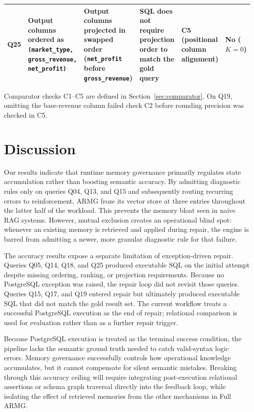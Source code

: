 \begin{table}[t]
\begin{tabularx}{\textwidth}{@{}c >{\raggedright\arraybackslash}p{3.3cm} >{\raggedright\arraybackslash}p{3.5cm} >{\raggedright\arraybackslash}p{2.8cm} >{\raggedright\arraybackslash}p{2.3cm} >{\raggedright\arraybackslash}X@{}}
Q25 & Output columns ordered as \texttt{(market\_type, gross\_revenue, net\_profit)} & Output columns projected in swapped order (\texttt{net\_profit} before \texttt{gross\_revenue}) & SQL does not require projection order to match the gold query & C5 (positional column alignment) & No ($K=0$) \\
\bottomrule
\end{tabularx}
\vspace{2.0pt}
\begin{minipage}{\textwidth}
\footnotesize Comparator checks C1--C5 are defined in Section~\ref{sec:comparator}. On Q19, omitting the base-revenue column failed check C2 before rounding precision was checked in C5.
\end{minipage}
\end{table}

\section{Discussion}
Our results indicate that runtime memory governance primarily regulates state accumulation rather than boosting semantic accuracy. By admitting diagnostic rules only on queries Q04, Q13, and Q15 and subsequently routing recurring errors to reinforcement, ARMG froze its vector store at three entries throughout the latter half of the workload. This prevents the memory bloat seen in naive RAG systems. However, mutual exclusion creates an operational blind spot: whenever an existing memory is retrieved and applied during repair, the engine is barred from admitting a newer, more granular diagnostic rule for that failure.

The accuracy results expose a separate limitation of exception-driven repair. Queries Q05, Q14, Q18, and Q25 produced executable SQL on the initial attempt despite missing ordering, ranking, or projection requirements. Because no PostgreSQL exception was raised, the repair loop did not revisit those queries. Queries Q15, Q17, and Q19 entered repair but ultimately produced executable SQL that did not match the gold result set. The current workflow treats a successful PostgreSQL execution as the end of repair; relational comparison is used for evaluation rather than as a further repair trigger.

Because PostgreSQL execution is treated as the terminal success condition, the pipeline lacks the semantic ground truth needed to catch valid-syntax logic errors. Memory governance successfully controls how operational knowledge accumulates, but it cannot compensate for silent semantic mistakes. Breaking through this accuracy ceiling will require integrating post-execution relational assertions or schema graph traversal directly into the feedback loop, while isolating the effect of retrieved memories from the other mechanisms in Full ARMG.

